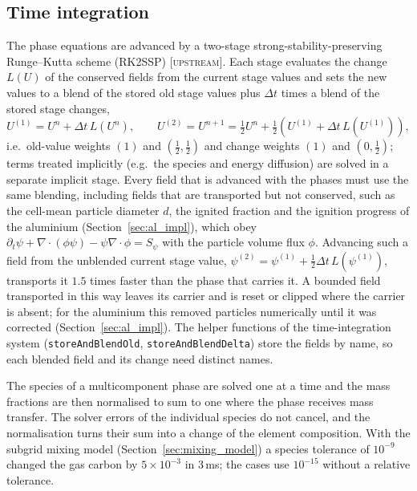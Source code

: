 \documentclass{article}
\newcommand{\up}{\textsc{[upstream]}}
\begin{document}
\subsection{Time integration}
\label{sec:timeint}

The phase equations are advanced by a two-stage strong-stability-preserving Runge--Kutta scheme (RK2SSP) \up. Each stage evaluates the change $L(U)$ of the conserved fields from the current stage values and sets the new values to a blend of the stored old stage values plus $\Delta t$ times a blend of the stored stage changes,
\begin{equation}
    U^{(1)} = U^n + \Delta t\,L(U^n), \qquad U^{(2)} = U^{n+1} = \tfrac12 U^n + \tfrac12\left(U^{(1)} + \Delta t\,L(U^{(1)})\right),
\end{equation}
i.e.\ old-value weights $(1)$ and $(\tfrac12, \tfrac12)$ and change weights $(1)$ and $(0, \tfrac12)$; terms treated implicitly (e.g.\ the species and energy diffusion) are solved in a separate implicit stage. Every field that is advanced with the phases must use the same blending, including fields that are transported but not conserved, such as the cell-mean particle diameter $d$, the ignited fraction and the ignition progress of the aluminium (Section~\ref{sec:al_impl}), which obey $\partial_t\psi + \nabla\cdot(\phi\psi) - \psi\nabla\cdot\phi = S_\psi$ with the particle volume flux $\phi$. Advancing such a field from the unblended current stage value, $\psi^{(2)} = \psi^{(1)} + \tfrac12\Delta t\,L(\psi^{(1)})$, transports it $1.5$ times faster than the phase that carries it. A bounded field transported in this way leaves its carrier and is reset or clipped where the carrier is absent; for the aluminium this removed particles numerically until it was corrected (Section~\ref{sec:al_impl}). The helper functions of the time-integration system (\texttt{storeAndBlendOld}, \texttt{storeAndBlendDelta}) store the fields by name, so each blended field and its change need distinct names.

The species of a multicomponent phase are solved one at a time and the mass fractions are then normalised to sum to one where the phase receives mass transfer. The solver errors of the individual species do not cancel, and the normalisation turns their sum into a change of the element composition. With the subgrid mixing model (Section~\ref{sec:mixing_model}) a species tolerance of $10^{-9}$ changed the gas carbon by $5\times10^{-3}$ in 3\,ms; the cases use $10^{-15}$ without a relative tolerance.
\end{document}
